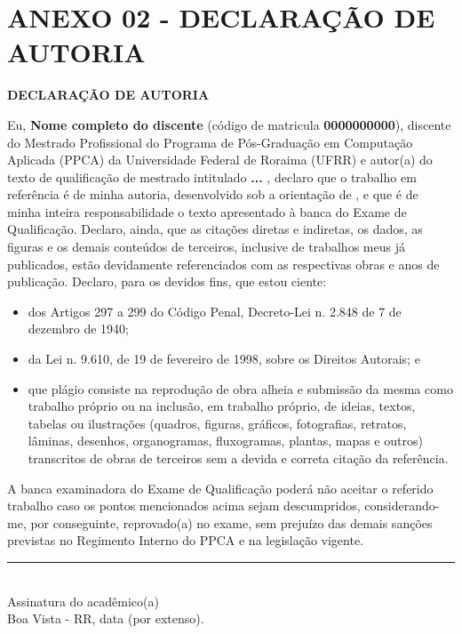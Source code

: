 \section*{ANEXO 02 - DECLARAÇÃO DE AUTORIA}
\label{sec:anexo-2}


\begin{center}
    \fontsize{12}{15}\selectfont
    \vspace*{0.5cm}
    \textbf{DECLARAÇÃO DE AUTORIA}
    \vspace*{1cm}
\end{center}

\vspace*{\fill}

Eu, \textbf{Nome completo do discente} (código de matricula \textbf{0000000000}), discente do Mestrado Profissional do Programa de Pós-Graduação em Computação Aplicada (PPCA) da Universidade Federal de Roraima (UFRR) e autor(a) do texto de qualificação de mestrado intitulado \textbf{ ... }, declaro que o trabalho em referência é de minha autoria, desenvolvido sob a orientação de \getorientador, e que é de minha inteira responsabilidade o texto apresentado à banca do Exame de Qualificação. Declaro, ainda, que as citações diretas e indiretas, os dados, as figuras e os demais conteúdos de terceiros, inclusive de trabalhos meus já publicados, estão devidamente referenciados com as respectivas obras e anos de publicação. Declaro, para os devidos fins, que estou ciente:
\begin{itemize}\setlength\itemsep{.02em}
    \item  dos Artigos 297 a 299 do Código Penal, Decreto-Lei n. 2.848 de 7 de dezembro de 1940;
    \item  da Lei n. 9.610, de 19 de fevereiro de 1998, sobre os Direitos Autorais; e
    \item  que plágio consiste na reprodução de obra alheia e submissão da mesma como trabalho próprio ou na inclusão, em trabalho próprio, de ideias, textos, tabelas ou ilustrações (quadros, figuras, gráficos, fotografias, retratos, lâminas, desenhos, organogramas, fluxogramas, plantas, mapas e outros) transcritos de obras de terceiros sem a devida e correta citação da referência.
\end{itemize}

A banca examinadora do Exame de Qualificação poderá não aceitar o referido trabalho caso os pontos mencionados acima sejam descumpridos, considerando-me, por conseguinte, reprovado(a) no exame, sem prejuízo das demais sanções previstas no Regimento Interno do PPCA e na legislação vigente.

\vspace*{\fill}

\begin{center}
    \rule{7cm}{0.4pt} \\
    \fontsize{12}{15}\selectfont Assinatura do acadêmico(a) \\ 
    Boa Vista - RR, data (por extenso).
\end{center}

\vfill